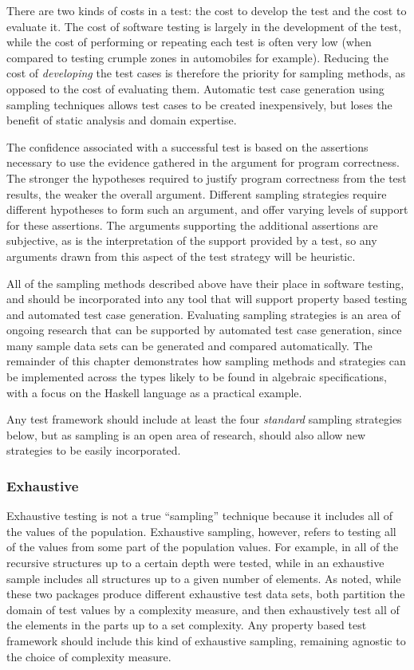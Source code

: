 There are two kinds of costs in a test:
the cost to develop the test and the cost to evaluate it.
The cost of software testing is largely in the development of the test,
while the cost of performing or repeating each test is often very low
(when compared to testing crumple zones in automobiles for example).
Reducing the cost of \emph{developing} the test cases is 
therefore the priority for sampling methods,
as opposed to the cost of evaluating them.
Automatic test case generation using sampling techniques 
allows test cases to be created inexpensively,
but loses the benefit of static analysis and domain expertise.

The confidence associated with a successful test 
is based on the assertions necessary to use the evidence gathered
in the argument for program correctness.
The stronger the hypotheses required to justify program correctness  from the test results,
the weaker the overall argument.
Different sampling strategies require different hypotheses to form such an argument,
and offer varying levels of support for these assertions.
The arguments supporting the additional assertions are subjective,
as is the interpretation of the support provided by a test,
so any arguments drawn from this aspect of the test strategy will be heuristic.

All of the sampling methods described above have their place in software testing,
and should be incorporated into any tool that will support property based testing
and automated test case generation.
Evaluating sampling strategies is an area of ongoing research
that can be supported by automated test case generation,
since many sample data sets can be generated and compared automatically.
The remainder of this chapter demonstrates how 
sampling methods and strategies can be implemented
across the types likely to be found in algebraic specifications,
with a focus on the Haskell language as a practical example.

Any test framework  should include at least 
the four \emph{standard} sampling strategies below,
but as sampling is an open area of research, 
should also allow new strategies to be easily incorporated.

\subsubsection{Exhaustive}

Exhaustive testing is not a true ``sampling'' technique because 
it includes all of the values of the population.
Exhaustive sampling, however, refers to testing all of the values
from some part of the population values.
For example, in \SC all of the recursive structures up to a certain depth were tested,
while in \FEAT an exhaustive sample includes all structures up to a given number of elements.
As noted, while these two packages produce different exhaustive test data sets,
both partition the domain of test values by a complexity measure,
and then exhaustively test all of the elements in the parts up to a set complexity.
Any property based test framework should include this kind of exhaustive sampling,
remaining agnostic to the choice of complexity measure.

